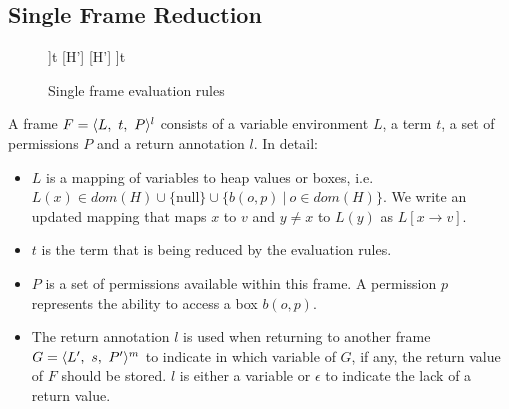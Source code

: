 \subsection{Single Frame Reduction}
\begin{figure}
\begin{multicols}{2}
\break
\end{multicols}
\vspace{3mm}
    {\reducframe
        {}
        {\sframe[L[x \rightarrow \vn{FM}(f)]]{t}}
    }
\vspace{3mm}
\vspace{3mm}
    {\reducframe
        {}
        [H']
        {}
    }
\vspace{3mm}
    {\reducframe
        {}
        [H']
        {\sframe[L[x \rightarrow o]]{t}}
    }
    \caption{Single frame evaluation rules}
    \label{fig:single-frame-evaluation}
\end{figure}

A frame $F = \sframe{t}$ consists of a variable environment $L$, a term $t$, a set of permissions $P$ and a return annotation $l$. In detail:
\begin{itemize}
    \item 
    $L$ is a mapping of variables to heap values or boxes, i.e. $L(x) \in dom(H) \cup \{\text{null}\} \cup \{b(o, p)\ |\ o \in dom(H)\}$. We write an updated mapping that maps $x$ to $v$ and $y\neq x$ to $L(y)$ as $L[x \rightarrow v]$.
    \item $t$ is the term that is being reduced by the evaluation rules.
    \item $P$ is a set of permissions available within this frame. A permission $p$ represents the ability to access a box $b(o,p)$.
    \item The return annotation $l$ is used when returning to another frame $G = \sframe[L']{s}[P'][m]$ to indicate in which variable of $G$, if any, the return value of $F$ should be stored. $l$ is either a variable or $\epsilon$ to indicate the lack of a return value.
\end{itemize}

